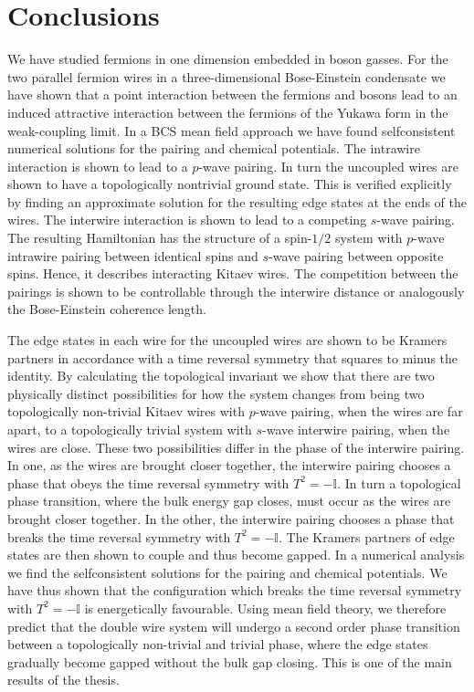 \documentclass[11pt, twoside]{Thesis}
\begin{document}
\newpage



\part{Conclusions}
\fancyhead[LE,RO]{\thepage}
\chead{}
We have studied fermions in one dimension embedded in boson gasses. For the two parallel fermion wires in a three-dimensional Bose-Einstein condensate we have shown that a point interaction between the fermions and bosons lead to an induced attractive interaction between the fermions of the Yukawa form in the weak-coupling limit. In a BCS mean field approach we have found selfconsistent numerical solutions for the pairing and chemical potentials. The intrawire interaction is shown to lead to a $p$-wave pairing. In turn the uncoupled wires are shown to have a topologically nontrivial ground state. This is verified explicitly by finding an approximate solution for the resulting edge states at the ends of the wires. The interwire interaction is shown to lead to a competing $s$-wave pairing. The resulting Hamiltonian has the structure of a spin-$1/2$ system with $p$-wave intrawire pairing between identical spins and $s$-wave pairing between opposite spins. Hence, it describes interacting Kitaev wires. The competition between the pairings is shown to be controllable through the interwire distance or analogously the Bose-Einstein coherence length. 

The edge states in each wire for the uncoupled wires are shown to be Kramers partners in accordance with a time reversal symmetry that squares to minus the identity. By calculating the topological invariant we show that there are two physically distinct possibilities for how the system changes from being two topologically non-trivial Kitaev wires with $p$-wave pairing, when the wires are far apart, to a topologically trivial system with $s$-wave interwire pairing, when the wires are close. These two possibilities differ in the phase of the interwire pairing. In one, as the wires are brought closer together, the interwire pairing chooses a phase that obeys the time reversal symmetry with $T^2 = -\mathbb{I}$. In turn a topological phase transition, where the bulk energy gap closes, must occur as the wires are brought closer together. In the other, the interwire pairing chooses a phase that breaks the time reversal symmetry with $T^2 = -\mathbb{I}$. The Kramers partners of edge states are then shown to couple and thus become gapped. In a numerical analysis we find the selfconsistent solutions for the pairing and chemical potentials. We have thus shown that the configuration which breaks the time reversal symmetry with $T^2 = -\mathbb{I}$ is energetically favourable. Using mean field theory, we therefore predict that the double wire system will undergo a second order phase transition between a topologically non-trivial and trivial phase, where the edge states gradually become gapped without the bulk gap closing. This is one of the main results of the thesis. 
\end{document}
